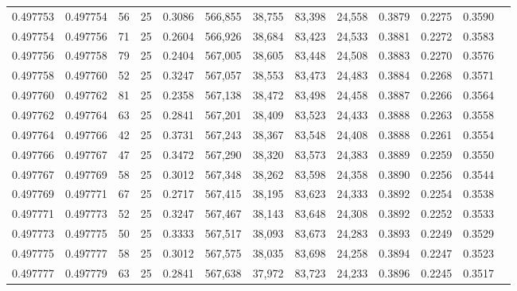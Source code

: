 \begin{tabular}{rrrrrrrrrrrrr}
0.497753 & 0.497754 &    56 &  25 &                                     0.3086 & 566,855 &  38,755 &  83,398 &  24,558 & 0.3879 & 0.2275 & 0.3590 \\
0.497754 & 0.497756 &    71 &  25 &                                     0.2604 & 566,926 &  38,684 &  83,423 &  24,533 & 0.3881 & 0.2272 & 0.3583 \\
0.497756 & 0.497758 &    79 &  25 &                                     0.2404 & 567,005 &  38,605 &  83,448 &  24,508 & 0.3883 & 0.2270 & 0.3576 \\
0.497758 & 0.497760 &    52 &  25 &                                     0.3247 & 567,057 &  38,553 &  83,473 &  24,483 & 0.3884 & 0.2268 & 0.3571 \\
0.497760 & 0.497762 &    81 &  25 &                                     0.2358 & 567,138 &  38,472 &  83,498 &  24,458 & 0.3887 & 0.2266 & 0.3564 \\
0.497762 & 0.497764 &    63 &  25 &                                     0.2841 & 567,201 &  38,409 &  83,523 &  24,433 & 0.3888 & 0.2263 & 0.3558 \\
0.497764 & 0.497766 &    42 &  25 &                                     0.3731 & 567,243 &  38,367 &  83,548 &  24,408 & 0.3888 & 0.2261 & 0.3554 \\
0.497766 & 0.497767 &    47 &  25 &                                     0.3472 & 567,290 &  38,320 &  83,573 &  24,383 & 0.3889 & 0.2259 & 0.3550 \\
0.497767 & 0.497769 &    58 &  25 &                                     0.3012 & 567,348 &  38,262 &  83,598 &  24,358 & 0.3890 & 0.2256 & 0.3544 \\
0.497769 & 0.497771 &    67 &  25 &                                     0.2717 & 567,415 &  38,195 &  83,623 &  24,333 & 0.3892 & 0.2254 & 0.3538 \\
0.497771 & 0.497773 &    52 &  25 &                                     0.3247 & 567,467 &  38,143 &  83,648 &  24,308 & 0.3892 & 0.2252 & 0.3533 \\
0.497773 & 0.497775 &    50 &  25 &                                     0.3333 & 567,517 &  38,093 &  83,673 &  24,283 & 0.3893 & 0.2249 & 0.3529 \\
0.497775 & 0.497777 &    58 &  25 &                                     0.3012 & 567,575 &  38,035 &  83,698 &  24,258 & 0.3894 & 0.2247 & 0.3523 \\
0.497777 & 0.497779 &    63 &  25 &                                     0.2841 & 567,638 &  37,972 &  83,723 &  24,233 & 0.3896 & 0.2245 & 0.3517 \\

\end{tabular}
